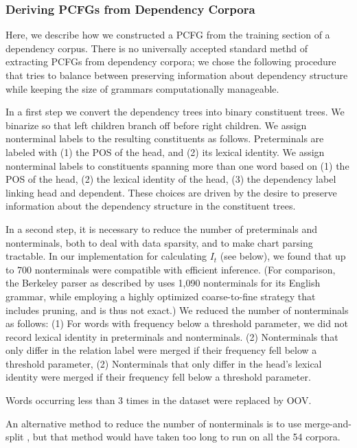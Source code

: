 \documentclass[11pt,letterpaper]{article}
\begin{document}
\subsubsection{Deriving PCFGs from Dependency Corpora}

Here, we describe how we constructed a PCFG from the training section of a dependency corpus.
There is no universally accepted standard methd of extracting PCFGs from dependency corpora; we chose the following procedure that tries to balance between preserving information about dependency structure while keeping the size of grammars computationally manageable.

In a first step we convert the dependency trees into binary constituent trees. We binarize so that left children branch off before right children.
We assign nonterminal labels to the resulting constituents as follows.
Preterminals are labeled with (1) the POS of the head, and (2) its lexical identity.
We assign nonterminal labels to constituents spanning more than one word based on (1) the POS of the head, (2) the lexical identity of the head, (3) the dependency label linking head and dependent.
These choices are driven by the desire to preserve information about the dependency structure in the constituent trees.

In a second step, it is necessary to reduce the number of preterminals and nonterminals, both to deal with data sparsity, and to make chart parsing tractable.
In our implementation for calculating $I_t$ (see below), we found that up to 700 nonterminals were compatible with efficient inference.
(For comparison, the Berkeley parser as described by \citet{DBLP:conf/aaai/PetrovK07} uses 1,090 nonterminals for its English grammar, while employing a highly optimized coarse-to-fine strategy that includes pruning, and is thus not exact.)
We reduced the number of nonterminals as follows:
(1) For words with frequency below a threshold parameter, we did not record lexical identity in preterminals and nonterminals.
(2) Nonterminals that only differ in the relation label were merged if their frequency fell below a threshold parameter,
(2) Nonterminals that only differ in the head's lexical identity were merged if their frequency fell below a threshold parameter.

Words occurring less than 3 times in the dataset were replaced by OOV.

An alternative method to reduce the number of nonterminals is to use merge-and-split \citep{DBLP:conf/aaai/PetrovK07}, but that method would have taken too long to run on all the 54 corpora.
\end{document}
